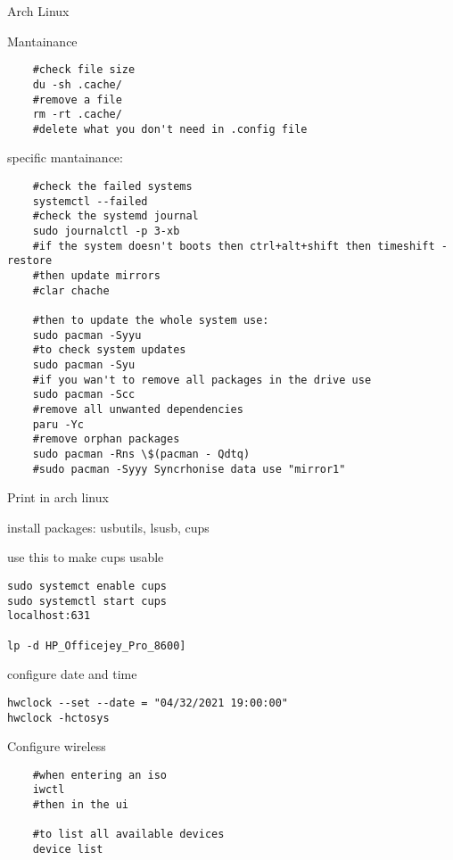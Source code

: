 \newpage
\begin{section}{Arch Linux}
\begin{subsection}{Mantainance}
\begin{verbatim}
	#check file size
	du -sh .cache/
	#remove a file
	rm -rt .cache/
	#delete what you don't need in .config file
\end{verbatim}

specific mantainance:

\begin{verbatim}
	#check the failed systems
	systemctl --failed
	#check the systemd journal
	sudo journalctl -p 3-xb
	#if the system doesn't boots then ctrl+alt+shift then timeshift -restore
	#then update mirrors
	#clar chache

	#then to update the whole system use:
	sudo pacman -Syyu
	#to check system updates
	sudo pacman -Syu
	#if you wan't to remove all packages in the drive use
	sudo pacman -Scc
	#remove all unwanted dependencies
	paru -Yc 
	#remove orphan packages
	sudo pacman -Rns \$(pacman - Qdtq)
	#sudo pacman -Syyy Syncrhonise data use "mirror1"
\end{verbatim}

\end{subsection}
\begin{subsection}{Print in arch linux}

install packages: usbutils, lsusb, cups

use this to make cups usable
\begin{verbatim}
sudo systemct enable cups
sudo systemctl start cups
localhost:631

lp -d HP_Officejey_Pro_8600]
\end{verbatim}

\end{subsection}


\begin{subsection}{configure date and time}

\begin{verbatim}
hwclock --set --date = "04/32/2021 19:00:00"
hwclock -hctosys
\end{verbatim}

\end{subsection}

\begin{subsection}{Configure wireless}

\begin{verbatim}
	#when entering an iso
	iwctl
	#then in the ui

	#to list all available devices
	device list


\end{verbatim}
\end{subsection}
\end{section}
